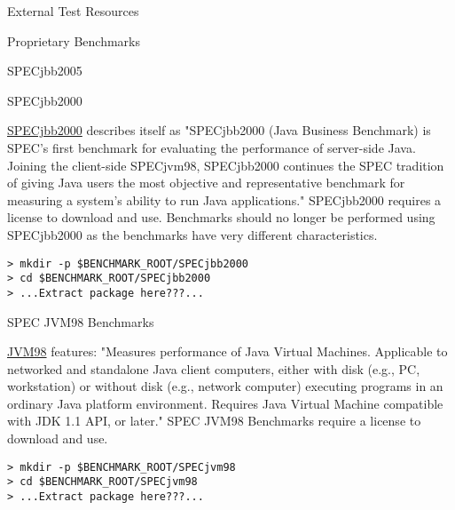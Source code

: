\begin{section}{External Test Resources}
\begin{subsection}{Proprietary Benchmarks}
\begin{subsubsection}{SPECjbb2005}
\end{subsubsection}

\begin{subsubsection}{SPECjbb2000}

\href{http://www.spec.org/jbb2000/}{SPECjbb2000} describes itself as "SPECjbb2000 (Java Business Benchmark) is SPEC's first benchmark for evaluating the performance of server-side Java. Joining the client-side SPECjvm98, SPECjbb2000 continues the SPEC tradition of giving Java users the most objective and representative benchmark for measuring a system's ability to run Java applications." SPECjbb2000 requires a license to download and use. Benchmarks should no longer be performed using SPECjbb2000 as the benchmarks have very different characteristics.

\begin{lstlisting}
> mkdir -p $BENCHMARK_ROOT/SPECjbb2000
> cd $BENCHMARK_ROOT/SPECjbb2000
> ...Extract package here???...
\end{lstlisting}

\end{subsubsection}

\begin{subsubsection}{SPEC JVM98 Benchmarks}

\href{http://www.spec.org/jvm98/}{JVM98} features: "Measures performance of Java Virtual Machines. Applicable to networked and standalone Java client computers, either with disk (e.g., PC, workstation) or without disk (e.g., network computer) executing programs in an ordinary Java platform environment. Requires Java Virtual Machine compatible with JDK 1.1 API, or later." SPEC JVM98 Benchmarks require a license to download and use.

\begin{lstlisting}
> mkdir -p $BENCHMARK_ROOT/SPECjvm98
> cd $BENCHMARK_ROOT/SPECjvm98
> ...Extract package here???...
\end{lstlisting}

\end{subsubsection}

\end{subsection}

\end{section}